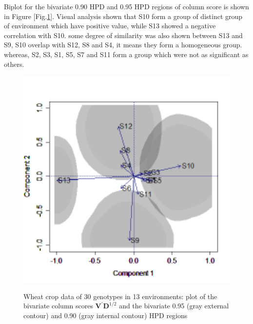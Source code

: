 \clearpage
Biplot for the bivariate 0.90 HPD and 0.95 HPD regions  of column score is shown in Figure [Fig.\ref{Figure:4.13}]. Visual analysis shown that S10 form a group of distinct group of environment which have positive value, while S13 showed a negative correlation with S10. some degree of similarity was also shown between S13 and S9,  S10 overlap with S12, S8 and S4, it means they form a homogeneous group. whereas, S2, S3, S1, S5, S7 and S11 form a group which were not as significant as others.
\begin{figure} [H]
	\centering  
	\scalebox{0.3}
	{\includegraphics[width=540mm]{02ThesisMain/Ch04RD/figures/c-biplot-80-90.pdf}}
	\caption[Bayesian biplot for environments]{Wheat crop data of 30 genotypes in 13 environments: plot of the bivariate column scores $\textbf{V}^\prime\textbf{D}^{1/2}$ and the bivariate 0.95 (gray external contour) and 0.90 (gray internal contour) HPD regions}
\label{Figure:4.13}
\end{figure}


